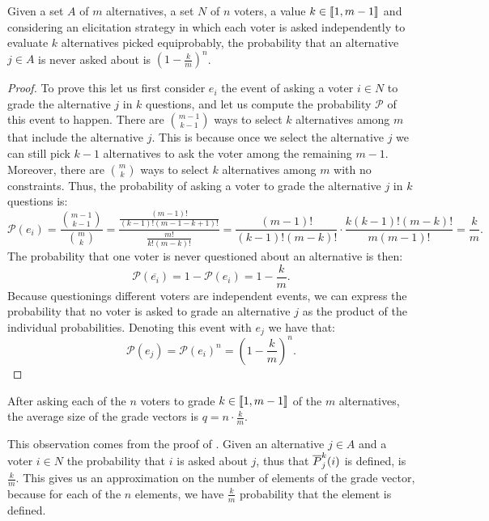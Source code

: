 	\begin{proposition}
		\label{pr:probabilityJ}
		Given a set $A$ of $m$ alternatives, a set $N$ of $n$ voters, a value $k\in\llbracket1,m-1\rrbracket$ and considering an elicitation strategy in which each voter is asked independently to evaluate $k$ alternatives picked equiprobably, the probability that an alternative $j\in A$ is never asked about is $(1-\frac{k}{m})^n$.
	\end{proposition}
	\begin{proof}
		To prove this let us first consider $e_i$ the event of asking a voter $i\in N$ to grade the alternative $j$ in $k$ questions, and let us compute the probability $\mathcal{P}$ of this event to happen.
		There are $\binom{m-1}{k-1}$ ways to select $k$ alternatives among $m$ that include the alternative $j$. This is because once we select the alternative $j$ we can still pick $k-1$ alternatives to ask the voter among the remaining $m-1$.
		Moreover, there are $\binom{m}{k}$ ways to select $k$ alternatives among $m$ with no constraints. Thus, the probability of asking a voter to grade the alternative $j$ in $k$ questions is:
		\[\mathcal{P}(e_i)= \frac{\binom{m-1}{k-1}}{\binom{m}{k}}=\frac{\frac{(m-1)!}{(k-1)!(m-1-k+1)!}}{\frac{m!}{k!(m-k)!}}=\frac{(m-1)!}{(k-1)!(m-k)!}\cdot\frac{k(k-1)!(m-k)!}{m(m-1)!}=\frac{k}{m}.\]
		The probability that one voter is never questioned about an alternative is then:
		\[\mathcal{P}(\overline{e_i})=1-\mathcal{P}(e_i)=1-\frac{k}{m}.\]
		Because questionings different voters are independent events, we can express the probability that no voter is asked to grade an alternative $j$ as the product of the individual probabilities. Denoting this event with $e_j$ we have that:
		\[\mathcal{P}(e_j)=\mathcal{P}(e_i)^n=\left(1-\frac{k}{m}\right)^n.\]
	\end{proof}

	\begin{remark}
		\label{rm:sizeGV}
		After asking each of the $n$ voters to grade $k\in \llbracket1,m-1\rrbracket$ of the $m$ alternatives, the average size of the grade vectors is $q = n \cdot \frac{k}{m}$.
	\end{remark}
	This observation comes from the proof of . Given an alternative $j\in A$ and a voter $i\in N$ the probability that $i$ is asked about $j$, thus that $\overline{P}^k_{j}(i)$ is defined, is $\frac{k}{m}$. This gives us an approximation on the number of elements of the grade vector, because for each of the $n$ elements, we have $\frac{k}{m}$ probability that the element is defined.
	
